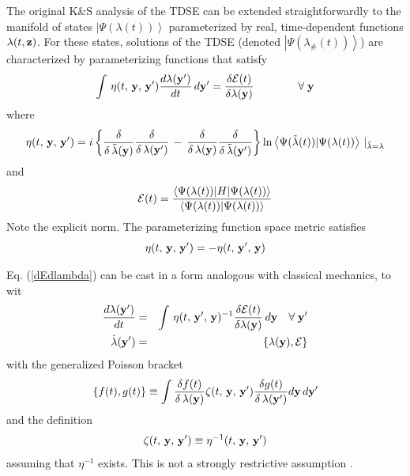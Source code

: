 The original K\&S analysis of the TDSE can be extended straightforwardly to
the manifold of states $\left| \Psi (\lambda (t))\right\rangle $
parameterized by real, time-dependent functions $\lambda (t,{\bf z})$. For
these states, solutions of the TDSE (denoted $\left| \Psi
(\lambda_{\#}(t))\right\rangle $) are characterized by parameterizing
functions that satisfy 
\begin{equation}
\int \,\eta (t,\,{\bf y},\,{\bf y}^{\prime })\frac{d\lambda ({\bf y}^{\prime
})}{dt}\,d{\bf y}^{\prime }=\frac{\delta {\cal E}(t)}{\delta \lambda ({\bf y}%
)}\qquad \qquad \forall \;{\bf y}  \label{dEdlambda}
\end{equation}%
where 
\begin{equation}
\eta (t,\,{\bf y},\,{\bf y}^{\prime })=i\left\{ \frac{\delta }{\delta \,%
\tilde{\lambda}({\bf y})}\frac{\delta }{\delta \,\lambda ({\bf y}^{\prime })}%
\,-\,\frac{\delta }{\delta \,\lambda ({\bf y})}\frac{\delta }{\delta \,%
\tilde{\lambda}({\bf y}^{\prime })}\right\} \ln \left\langle \Psi (\tilde{%
\lambda}(t))|\Psi (\lambda (t))\right\rangle \,|_{\tilde{\lambda}=\lambda }
\label{eta}
\end{equation}%
and 
\begin{equation}
{\cal E}(t)=\frac{\left\langle \Psi (\lambda (t))|H|\Psi (\lambda
(t))\right\rangle }{\left\langle \Psi (\lambda (t))|\Psi (\lambda
(t))\right\rangle }  \label{Eoft}
\end{equation}%
Note the explicit norm. The parameterizing function space metric satisfies 
\begin{equation}
\eta (t,\,{\bf y},\,{\bf y}^{\prime })=-\eta (t,\,{\bf y}^{\prime },\,{\bf y}%
)
\end{equation}

Eq. (\ref{dEdlambda}) can be cast in a form analogous with classical
mechanics, to wit 
\begin{eqnarray}
\frac{d\lambda ({\bf y}^{\prime })}{dt} &=&\int \,\eta (t,\,{\bf y}^{\prime
},\,{\bf y})^{-1}\frac{\delta {\cal E}(t)}{\delta \lambda ({\bf y})}\,d{\bf y%
}\quad \forall \;{\bf y}^{\prime }  \nonumber \\
\dot{\lambda}({\bf y}^{\prime }) &=&\{\lambda ({\bf y}),{\cal E}\}
\label{genEOM}
\end{eqnarray}%
with the generalized Poisson bracket 
\begin{equation}
\{f(t),g(t)\}\equiv \int \frac{\delta f(t)}{\delta \,\lambda ({\bf y})}\zeta
(t,\,{\bf y},\,{\bf y}^{\prime })\frac{\delta g(t)}{\delta \,\lambda ({\bf y}%
^{\prime })}d{\bf y}\,d{\bf y}^{\prime }  \label{genPoisson}
\end{equation}%
and the definition 
\begin{equation}
\zeta (t,\,{\bf y},\,{\bf y}^{\prime })\equiv \eta ^{-1}(t,\,{\bf y},\,{\bf y%
}^{\prime })  \label{etainverse}
\end{equation}%
assuming that $\eta ^{-1}$ exists. This is not a strongly restrictive
assumption \cite{etainv}.

